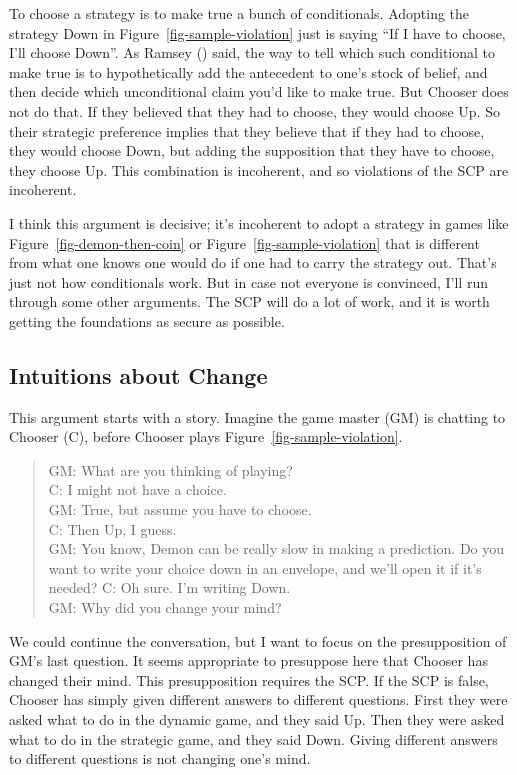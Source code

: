 \documentclass[
  11pt,
  letterpaper,
  DIV=11,
  numbers=noendperiod,
  twoside]{scrartcl}
\begin{document}
To choose a strategy is to make true a bunch of conditionals. Adopting
the strategy Down in Figure~\ref{fig-sample-violation} just is saying
``If I have to choose, I'll choose Down''. As Ramsey
() said, the way to
tell which such conditional to make true is to hypothetically add the
antecedent to one's stock of belief, and then decide which unconditional
claim you'd like to make true. But Chooser does not do that. If they
believed that they had to choose, they would choose Up. So their
strategic preference implies that they believe that if they had to
choose, they would choose Down, but adding the supposition that they
have to choose, they choose Up. This combination is incoherent, and so
violations of the SCP are incoherent.

I think this argument is decisive; it's incoherent to adopt a strategy
in games like Figure~\ref{fig-demon-then-coin} or
Figure~\ref{fig-sample-violation} that is different from what one knows
one would do if one had to carry the strategy out. That's just not how
conditionals work. But in case not everyone is convinced, I'll run
through some other arguments. The SCP will do a lot of work, and it is
worth getting the foundations as secure as possible.

\subsection{Intuitions about Change}\label{sec-intuitions-change}

This argument starts with a story. Imagine the game master (GM) is
chatting to Chooser (C), before Chooser plays
Figure~\ref{fig-sample-violation}.

\begin{quote}
GM: What are you thinking of playing?\\
C: I might not have a choice.\\
GM: True, but assume you have to choose.\\
C: Then Up, I guess.\\
GM: You know, Demon can be really slow in making a prediction. Do you
want to write your choice down in an envelope, and we'll open it if it's
needed? C: Oh sure. I'm writing Down.\\
GM: Why did you change your mind?
\end{quote}

We could continue the conversation, but I want to focus on the
presupposition of GM's last question. It seems appropriate to presuppose
here that Chooser has changed their mind. This presupposition requires
the SCP. If the SCP is false, Chooser has simply given different answers
to different questions. First they were asked what to do in the dynamic
game, and they said Up. Then they were asked what to do in the strategic
game, and they said Down. Giving different answers to different
questions is not changing one's mind.
\end{document}
